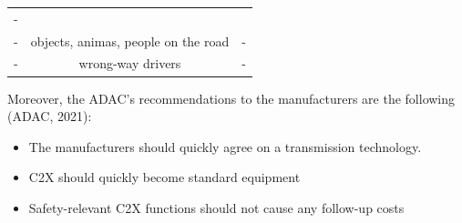 \documentclass[
]{book}
\providecommand{\tightlist}{%
  \setlength{\itemsep}{0pt}\setlength{\parskip}{0pt}}
\begin{document}
\begin{longtable}[]{@{}ccc@{}}
\begin{minipage}[t]{0.30\columnwidth}
-\strut
\end{minipage}\tabularnewline
\begin{minipage}[t]{0.30\columnwidth}\centering
-\strut
\end{minipage} & \begin{minipage}[t]{0.30\columnwidth}\centering
objects, animas, people on the road\strut
\end{minipage} & \begin{minipage}[t]{0.30\columnwidth}\centering
-\strut
\end{minipage}\tabularnewline
\begin{minipage}[t]{0.30\columnwidth}\centering
-\strut
\end{minipage} & \begin{minipage}[t]{0.30\columnwidth}\centering
wrong-way drivers\strut
\end{minipage} & \begin{minipage}[t]{0.30\columnwidth}\centering
-\strut
\end{minipage}\tabularnewline
\bottomrule
\end{longtable}

Moreover, the ADAC's recommendations to the manufacturers are the following (ADAC, 2021):

\begin{itemize}
\tightlist
\item
  The manufacturers should quickly agree on a transmission technology.
\item
  C2X should quickly become standard equipment
\item
  Safety-relevant C2X functions should not cause any follow-up costs
\end{itemize}
\end{document}
